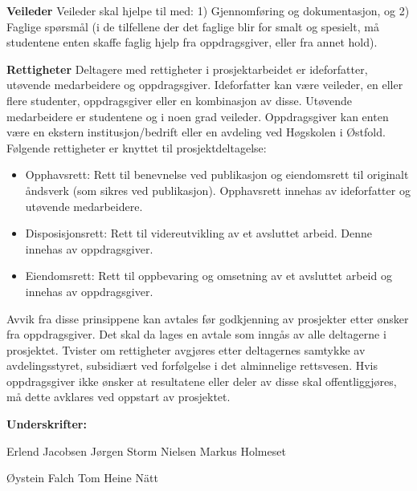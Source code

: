 \hspace{-17pt}\textbf{Veileder}\newline
Veileder skal hjelpe til med: 1) Gjennomføring og dokumentasjon, og 2) Faglige spørsmål (i de tilfellene der det faglige blir for smalt og spesielt, må studentene enten skaffe faglig hjelp fra oppdragsgiver, eller fra annet hold).\newline
\newpage

\hspace{-17pt}\textbf{Rettigheter}\newline
Deltagere med rettigheter i prosjektarbeidet er ideforfatter, utøvende medarbeidere og oppdragsgiver.
Ideforfatter kan være veileder, en eller flere studenter, oppdragsgiver eller en kombinasjon av disse.
Utøvende medarbeidere er studentene og i noen grad veileder.
Oppdragsgiver kan enten være en ekstern institusjon/bedrift eller en avdeling ved Høgskolen i Østfold.\newline
Følgende rettigheter er knyttet til prosjektdeltagelse:
\begin{itemize}
\item Opphavsrett: Rett til benevnelse ved publikasjon og eiendomsrett til originalt åndsverk (som sikres ved publikasjon). Opphavsrett innehas av ideforfatter og utøvende medarbeidere.

\item Disposisjonsrett: Rett til videreutvikling av et avsluttet arbeid. Denne innehas av oppdragsgiver.

\item Eiendomsrett: Rett til oppbevaring og omsetning av et avsluttet arbeid og innehas av oppdragsgiver.

\end{itemize}
Avvik fra disse prinsippene kan avtales før godkjenning av prosjekter etter ønsker fra oppdragsgiver. Det skal da lages en avtale som inngås av alle deltagerne i prosjektet. Tvister om rettigheter avgjøres etter deltagernes samtykke av avdelingsstyret, subsidiært ved forfølgelse i det alminnelige rettsvesen.\newline
Hvis oppdragsgiver ikke ønsker at resultatene eller deler av disse skal offentliggjøres, må dette avklares ved oppstart av prosjektet.

\vspace{40pt}

\begin{center}\textbf{Underskrifter:}

\vspace{20pt}
Erlend Jacobsen \hspace{50pt} Jørgen Storm Nielsen \hspace{50pt} Markus Holmeset

\vspace{80pt}
Øystein Falch \hspace{230pt} Tom Heine Nätt

\end{center}






